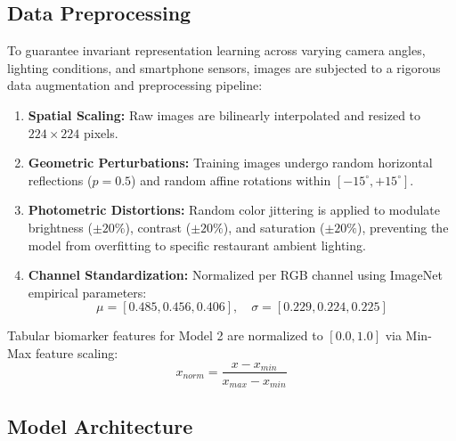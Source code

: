 \documentclass[10pt,journal,compsoc]{IEEEtran}
\begin{document}
\subsection{Data Preprocessing}
To guarantee invariant representation learning across varying camera angles, lighting conditions, and smartphone sensors, images are subjected to a rigorous data augmentation and preprocessing pipeline:
\begin{enumerate}
    \item \textbf{Spatial Scaling:} Raw images are bilinearly interpolated and resized to $224 \times 224$ pixels.
    \item \textbf{Geometric Perturbations:} Training images undergo random horizontal reflections ($p=0.5$) and random affine rotations within $[ -15^\circ, +15^\circ ]$.
    \item \textbf{Photometric Distortions:} Random color jittering is applied to modulate brightness ($\pm 20\%$), contrast ($\pm 20\%$), and saturation ($\pm 20\%$), preventing the model from overfitting to specific restaurant ambient lighting.
    \item \textbf{Channel Standardization:} Normalized per RGB channel using ImageNet empirical parameters:
    \begin{equation}
        \mu = [0.485, 0.456, 0.406], \quad \sigma = [0.229, 0.224, 0.225]
    \end{equation}
\end{enumerate}

Tabular biomarker features for Model 2 are normalized to $[0.0, 1.0]$ via Min-Max feature scaling:
\begin{equation}
    x_{norm} = \frac{x - x_{min}}{x_{max} - x_{min}}
\end{equation}

\subsection{Model Architecture}
\end{document}
